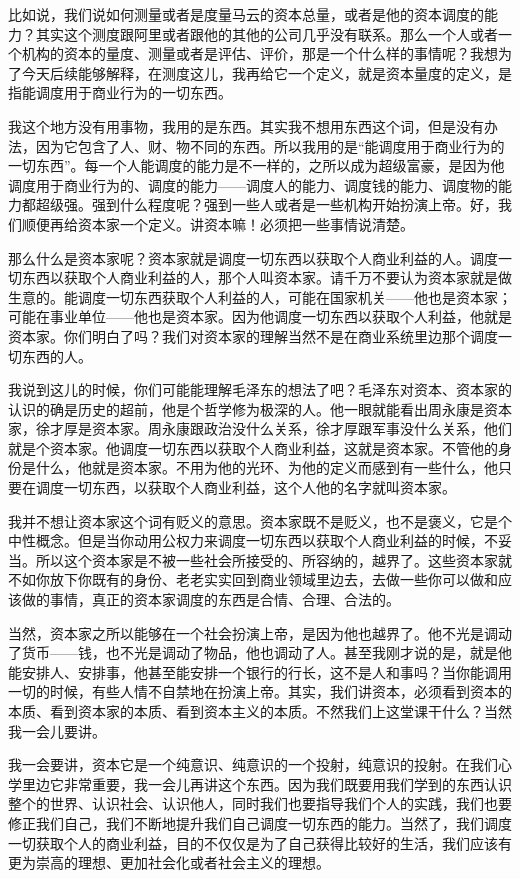 \documentclass[UTF8, 12pt, a4paper]{ctexrep}
\begin{document}
比如说，我们说如何测量或者是度量马云的资本总量，或者是他的资本调度的能力？其实这个测度跟阿里或者跟他的其他的公司几乎没有联系。那么一个人或者一个机构的资本的量度、测量或者是评估、评价，那是一个什么样的事情呢？我想为了今天后续能够解释，在测度这儿，我再给它一个定义，就是资本量度的定义，是指能调度用于商业行为的一切东西。

我这个地方没有用事物，我用的是东西。其实我不想用东西这个词，但是没有办法，因为它包含了人、财、物不同的东西。所以我用的是“能调度用于商业行为的一切东西”。每一个人能调度的能力是不一样的，之所以成为超级富豪，是因为他调度用于商业行为的、调度的能力——调度人的能力、调度钱的能力、调度物的能力都超级强。强到什么程度呢？强到一些人或者是一些机构开始扮演上帝。好，我们顺便再给资本家一个定义。讲资本嘛！必须把一些事情说清楚。

那么什么是资本家呢？资本家就是调度一切东西以获取个人商业利益的人。调度一切东西以获取个人商业利益的人，那个人叫资本家。请千万不要认为资本家就是做生意的。能调度一切东西获取个人利益的人，可能在国家机关——他也是资本家；可能在事业单位——他也是资本家。因为他调度一切东西以获取个人利益，他就是资本家。你们明白了吗？我们对资本家的理解当然不是在商业系统里边那个调度一切东西的人。

我说到这儿的时候，你们可能能理解毛泽东的想法了吧？毛泽东对资本、资本家的认识的确是历史的超前，他是个哲学修为极深的人。他一眼就能看出周永康是资本家，徐才厚是资本家。周永康跟政治没什么关系，徐才厚跟军事没什么关系，他们就是个资本家。他调度一切东西以获取个人商业利益，这就是资本家。不管他的身份是什么，他就是资本家。不用为他的光环、为他的定义而感到有一些什么，他只要在调度一切东西，以获取个人商业利益，这个人他的名字就叫资本家。

我并不想让资本家这个词有贬义的意思。资本家既不是贬义，也不是褒义，它是个中性概念。但是当你动用公权力来调度一切东西以获取个人商业利益的时候，不妥当。所以这个资本家是不被一些社会所接受的、所容纳的，越界了。这些资本家就不如你放下你既有的身份、老老实实回到商业领域里边去，去做一些你可以做和应该做的事情，真正的资本家调度的东西是合情、合理、合法的。

当然，资本家之所以能够在一个社会扮演上帝，是因为他也越界了。他不光是调动了货币——钱，也不光是调动了物品，他也调动了人。甚至我刚才说的是，就是他能安排人、安排事，他甚至能安排一个银行的行长，这不是人和事吗？当你能调用一切的时候，有些人情不自禁地在扮演上帝。其实，我们讲资本，必须看到资本的本质、看到资本家的本质、看到资本主义的本质。不然我们上这堂课干什么？当然我一会儿要讲。

我一会要讲，资本它是一个纯意识、纯意识的一个投射，纯意识的投射。在我们心学里边它非常重要，我一会儿再讲这个东西。因为我们既要用我们学到的东西认识整个的世界、认识社会、认识他人，同时我们也要指导我们个人的实践，我们也要修正我们自己，我们不断地提升我们自己调度一切东西的能力。当然了，我们调度一切获取个人的商业利益，目的不仅仅是为了自己获得比较好的生活，我们应该有更为崇高的理想、更加社会化或者社会主义的理想。
\end{document}
